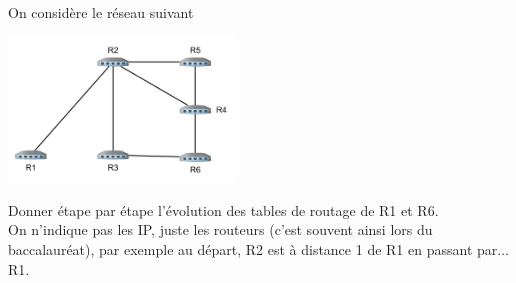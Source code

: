 \documentclass[a4paper,12pt,french]{article}
\begin{document}
\begin{exercice}
On considère le réseau suivant
\begin{center}
	\includegraphics[width=6cm]{img/res1.png}
\end{center}

Donner étape par étape l'évolution des tables de routage de R1 et R6.\\
On n'indique pas les IP, juste les routeurs (c'est souvent ainsi lors du baccalauréat), par exemple au départ, R2 est à distance 1 de R1 en passant par... R1.
\end{exercice}
\end{document}
